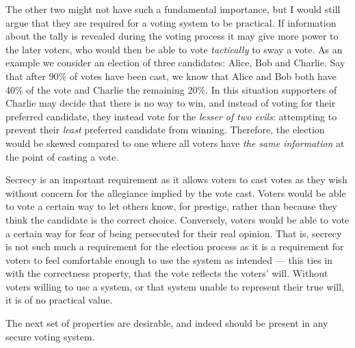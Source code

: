 The other two might not have such a fundamental importance, but I would still argue that they are required for a voting system to be practical. If information about the tally is revealed during the voting process it may give more power to the later voters, who would then be able to vote \emph{tactically} to sway a vote. As an example we consider an election of three candidates: Alice, Bob and Charlie. Say that after 90\% of votes have been cast, we know that Alice and Bob both have 40\% of the vote and Charlie the remaining 20\%. In this situation supporters of Charlie may decide that there is no way to win, and instead of voting for their preferred candidate, they instead vote for the \emph{lesser of two evils}: attempting to prevent their \emph{least} preferred candidate from winning. Therefore, the election would be skewed compared to one where all voters have \emph{the same information} at the point of casting a vote.

Secrecy is an important requirement as it allows voters to cast votes as they wish without concern for the allegiance implied by the vote cast. Voters would be able to vote a certain way to let others know, for prestige, rather than because they think the candidate is the correct choice. Conversely, voters would be able to vote a certain way for fear of being persecuted for their real opinion. That is, secrecy is not such much a requirement for the election process as it is a requirement for voters to feel comfortable enough to use the system as intended --- this ties in with the correctness property, that the vote reflects the voters' will. Without voters willing to use a system, or that system unable to represent their true will, it is of no practical value.

The next set of properties are desirable, and indeed should be present in any secure voting system.

